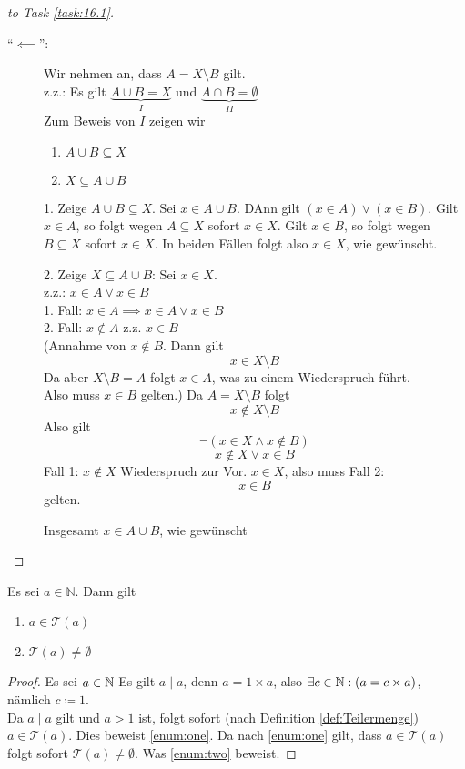 \documentclass{gadsescript}
\begin{document}
\begin{proof}[to Task \ref{task:16.1}]
\begin{description}
		\item[``$ \impliedby $'':]
			Wir nehmen an, dass $ A = X \setminus B $ gilt.\\
			z.z.: Es gilt $ \underbrace{ A \cup B = X }_{ I } $ und $ \underbrace{ A \cap B = \emptyset }_{ II } $\\
			Zum Beweis von $ I $ zeigen wir
			\begin{enumerate}
				\item \label{enum:ACupBSubseteqX} $ A \cup B \subseteq X $
				\item \label{enum:XSubseteqACupB} $ X \subseteq A \cup B $
			\end{enumerate}
			1. Zeige $ A \cup B \subseteq X $. Sei $ x \in A \cup B $. DAnn gilt $ ( x \in A ) \vee ( x \in B ) $. Gilt $ x \in A $, so folgt wegen $ A \subseteq X $ sofort $ x \in X $. Gilt $ x \in B $, so folgt wegen $ B \subseteq X $ sofort $ x \in X $. In beiden Fällen folgt also $ x \in X $, wie gewünscht.\par
			2. Zeige $ X \subseteq A \cup B $: Sei $ x \in X $.\\
			z.z.: $ x \in A \vee x \in B $\\
			1. Fall: $ x \in A \implies x \in A \vee x \in B $\\
			2. Fall: $ x \notin A $ z.z. $ x \in B $\\
			(Annahme von $ x \notin B $. Dann gilt
			\[ x \in X \setminus B \]
			Da aber $ X \setminus B = A $ folgt $ x \in A $, was zu einem Wiederspruch führt.\\
			Also muss $x  \in B $ gelten.)
			Da $ A = X \setminus B $ folgt
			\[ x \notin X \setminus B \]
			Also gilt
			\[ \neg ( x \in X \wedge x \notin B ) \]
			\[ x \notin X \vee x \in B \]
			Fall 1: $ x \notin X $ Wiederspruch zur Vor. $ x \in X $, also muss
			Fall 2: 
			\[x \in B \]
			gelten.\par
			Insgesamt $ x \in A \cup B $, wie gewünscht
	\end{description}
\end{proof}

\begin{lemma}
	Es sei $ a \in \mathbb{N} $. Dann gilt
	\begin{enumerate}[label=(\roman*)]
		\item $ a \in \mathcal{T}(a) $ \label{enum:one}
		\item $ \mathcal{T}(a) \neq \emptyset $ \label{enum:two}
	\end{enumerate}
	\begin{proof}
		Es sei $ a \in \mathbb{N} $ Es gilt $ a \mid a $, denn $ a = 1 \times a $, also $ \exists c \in \mathbb{N} : (a = c \times a ) $, nämlich $ c \coloneqq 1 $.\\
		Da $ a \mid a $ gilt und $ a > 1 $ ist, folgt sofort (nach Definition \ref{def:Teilermenge}) $ a \in \mathcal{T}(a) $. Dies beweist \ref{enum:one}.
		Da nach \ref{enum:one} gilt, dass $ a \in \mathcal{T}(a) $ folgt sofort $ \mathcal{T}(a) \neq \emptyset $. Was \ref{enum:two} beweist.
	\end{proof}
\end{lemma}
\end{document}
